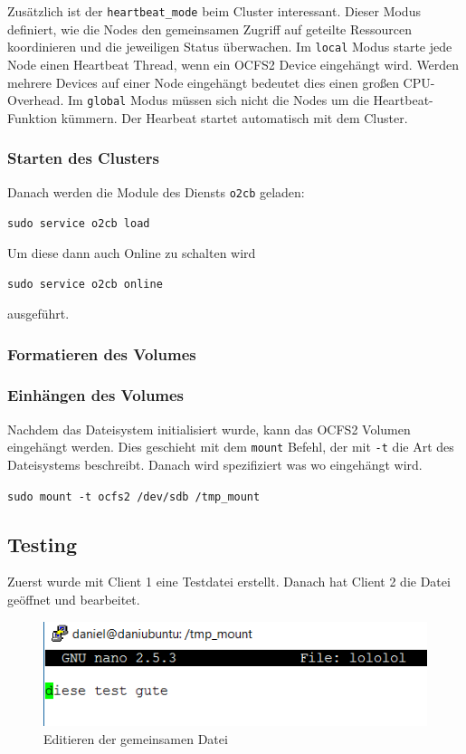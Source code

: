 Zusätzlich ist der \texttt{heartbeat\_mode} beim Cluster interessant. Dieser Modus definiert, wie die Nodes den gemeinsamen Zugriff auf geteilte Ressourcen koordinieren und die jeweiligen Status überwachen. Im \texttt{local} Modus starte jede Node einen Heartbeat Thread, wenn ein OCFS2 Device eingehängt wird. Werden mehrere Devices auf einer Node eingehängt bedeutet dies einen großen CPU-Overhead. Im \texttt{global} Modus müssen sich nicht die Nodes um die Heartbeat-Funktion kümmern. Der Hearbeat startet automatisch mit dem Cluster. \cite{heartbeat}
\subsubsection{Starten des Clusters}
Danach werden die Module des Diensts \texttt{o2cb} geladen:

\texttt{sudo service o2cb load}

Um diese dann auch Online zu schalten wird

\texttt{sudo service o2cb online}

ausgeführt. \cite{ocfs2faq}
\subsubsection{Formatieren des Volumes}

\subsubsection{Einhängen des Volumes}
Nachdem das Dateisystem initialisiert wurde, kann das OCFS2 Volumen eingehängt werden. Dies geschieht mit dem \texttt{mount} Befehl, der mit \texttt{-t} die Art des Dateisystems beschreibt. Danach wird spezifiziert was wo eingehängt wird. \cite{ocfs2faq}

\texttt{sudo mount -t ocfs2 /dev/sdb /tmp\_mount}
\subsection{Testing}
Zuerst wurde mit Client 1 eine Testdatei erstellt. Danach hat Client 2 die Datei geöffnet und bearbeitet.
\begin{figure}[!h]
	\begin{center}
		\includegraphics[width=0.5\linewidth]{images/edit.png}
		\caption{Editieren der gemeinsamen Datei}
		\label{edit}
	\end{center}
\end{figure}\

